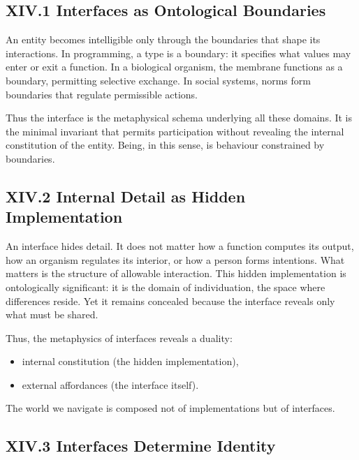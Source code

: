 \documentclass[12pt,letterpaper]{article}
\begin{document}
\subsection{XIV.1 Interfaces as Ontological Boundaries}

An entity becomes intelligible only through the boundaries that shape its interactions. In programming, a type is a boundary: it specifies what values may enter or exit a function. In a biological organism, the membrane functions as a boundary, permitting selective exchange. In social systems, norms form boundaries that regulate permissible actions.

Thus the interface is the metaphysical schema underlying all these domains. It is the minimal invariant that permits participation without revealing the internal constitution of the entity. Being, in this sense, is behaviour constrained by boundaries.

\subsection{XIV.2 Internal Detail as Hidden Implementation}

An interface hides detail. It does not matter how a function computes its output, how an organism regulates its interior, or how a person forms intentions. What matters is the structure of allowable interaction. This hidden implementation is ontologically significant: it is the domain of individuation, the space where differences reside. Yet it remains concealed because the interface reveals only what must be shared.

Thus, the metaphysics of interfaces reveals a duality:

\begin{itemize}
    \item internal constitution (the hidden implementation),
    \item external affordances (the interface itself).
\end{itemize}

The world we navigate is composed not of implementations but of interfaces.

\subsection{XIV.3 Interfaces Determine Identity}
\end{document}
